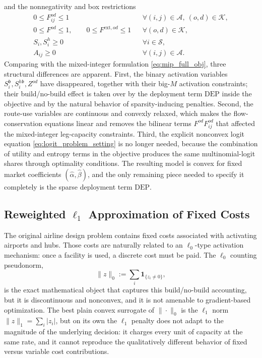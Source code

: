 and the nonnegativity and box restrictions
\begin{align}
0\le F_{ij}^{od}\le 1
&& \forall (i,j)\in\mathcal{A},\ (o,d)\in\mathcal{K},
\nonumber\\
0\le F^{od}\le 1,\qquad
0\le F^{\mathrm{ext},od}\le 1
&& \forall (o,d)\in\mathcal{K},
\nonumber\\
S_i,S_i^h\ge 0
&& \forall i\in\mathcal{S},
\nonumber\\
A_{ij}\ge 0
&& \forall (i,j)\in\mathcal{A}.
\label{eq:cont_domains}
\end{align}
Comparing with the mixed-integer formulation \eqref{eq:mip_full_obj}, three structural differences are apparent. First, the binary activation variables $S_i^{\mathfrak b},S_i^{h\mathfrak b},Z^{od}$ have disappeared, together with their big-$M$ activation constraints; their build/no-build effect is taken over by the deployment term $\mathrm{DEP}$ inside the objective and by the natural behavior of sparsity-inducing penalties. Second, the route-use variables are continuous and convexly relaxed, which makes the flow-conservation equations linear and removes the bilinear terms $F^{od}F_{ij}^{od}$ that affected the mixed-integer leg-capacity constraints. Third, the explicit nonconvex logit equation \eqref{eq:logit_problem_setting} is no longer needed, because the combination of utility and entropy terms in the objective produces the same multinomial-logit shares through optimality conditions. The resulting model is convex for fixed market coefficients $(\widehat{\alpha},\widehat{\beta})$, and the only remaining piece needed to specify it completely is the sparse deployment term $\mathrm{DEP}$.

\subsection{Reweighted $\ell_1$ Approximation of Fixed Costs}
\label{sec:reweighted_l1}
The original airline design problem contains fixed costs associated with activating airports and hubs. Those costs are naturally related to an $\ell_0$-type activation mechanism: once a facility is used, a discrete cost must be paid. The $\ell_0$ counting pseudonorm,
\begin{equation}
\|z\|_0:=\sum_i \mathbf{1}_{\{z_i\neq 0\}},
\label{eq:l0_definition}
\end{equation}
is the exact mathematical object that captures this build/no-build accounting, but it is discontinuous and nonconvex, and it is not amenable to gradient-based optimization. The best plain convex surrogate of $\|\cdot\|_0$ is the $\ell_1$ norm $\|z\|_1=\sum_i|z_i|$, but on its own the $\ell_1$ penalty does not adapt to the magnitude of the underlying decision: it charges every unit of capacity at the same rate, and it cannot reproduce the qualitatively different behavior of fixed versus variable cost contributions.

